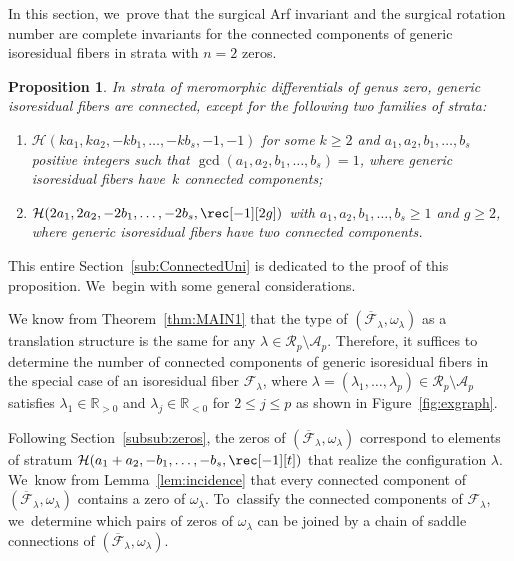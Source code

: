 \documentclass[JEP,XML,SOM,Unicode,NoFloatCountersInSection,published]{cedram}
\newtheorem{prop}[thm]{Proposition}
\theoremstyle{definition}
\begin{document}
\label{sub:ConnectedUni}

In this section, we~prove that the surgical Arf invariant and the surgical rotation number are complete invariants for the connected components of generic isoresidual fibers in strata with $n=2$ zeros.

\begin{prop}\label{prop:MAIN5}
In strata of meromorphic differentials of genus zero, generic isoresidual fibers are connected, except for the following two families of strata:
\begin{enumerate}
\item $\mathcal{H}(ka_{1},ka_{2},-kb_{1},\dots,-kb_{s},-1,-1)$ for some $k \geq 2$ and $a_{1},a_{2},b_{1},\dots,b_{s}$ positive integers such that $\gcd(a_{1},a_{2},b_{1},\dots,b_{s})=1$, where generic isoresidual fibers have~$k$ connected components;
\item $\mathcal{H}(2a_{1},2a_{2},-2b_{1},\dots,-2b_{s},\rec[-1][2g])$ with $a_{1},a_{2},b_{1},\dots,b_{s}\geq 1$ and $g \geq 2$, where generic isoresidual fibers have two connected components.
\end{enumerate}
\end{prop}

This entire Section~\ref{sub:ConnectedUni} is dedicated to the proof of this proposition. We~begin with some general considerations.

We know from Theorem~\ref{thm:MAIN1} that the type of $(\overline{\mathcal{F}}_{\lambda}, \omega_\lambda)$ as a translation structure is the same for any $\lambda \in \mathcal{R}_{p} \setminus \mathcal{A}_{p}$. Therefore, it suffices to determine the number of connected components of generic isoresidual fibers in the special case of an isoresidual fiber $\mathcal{F}_{\lambda}$, where $\lambda=(\lambda_{1},\dots,\lambda_{p})\in \mathcal{R}_{p} \setminus \mathcal{A}_{p}$ satisfies $\lambda_{1} \in \mathbb{R}_{>0}$ and $\lambda_{j} \in \mathbb{R}_{<0}$ for $2 \leq j \leq p$ as shown in Figure~\ref{fig:exgraph}.

Following Section~\ref{subsub:zeros}, the zeros of $(\overline{\mathcal{F}}_{\lambda}, \omega_\lambda)$ correspond to elements of stratum $\mathcal{H}(a_{1}+a_{2},-b_{1},\dots,-b_{s},\rec[-1][t])$ that realize the configuration $\lambda$. We~know from Lemma~\ref{lem:incidence} that every connected component of $(\overline{\mathcal{F}}_{\lambda}, \omega_\lambda)$ contains a zero of $\omega_{\lambda}$. To~classify the connected components of $\mathcal{F}_{\lambda}$, we~determine which pairs of zeros of $\omega_{\lambda}$ can be joined by a chain of saddle connections of $(\overline{\mathcal{F}}_{\lambda}, \omega_\lambda)$.
\end{document}
